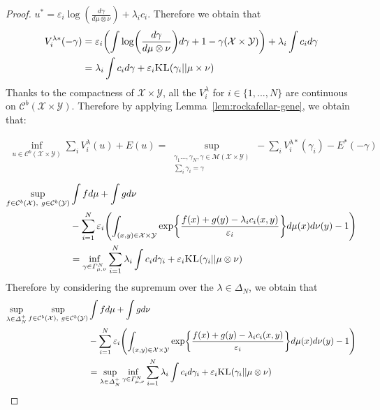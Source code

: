 \begin{proof}
$u^*=\varepsilon_i \log\left(\frac{d\gamma}{d\mu\otimes\nu}\right)+\lambda_i c_i$. Therefore we obtain that
\begin{align*}
 V^{\lambda*}_i(-\gamma)&=\varepsilon_i\left(\int \log\left(\frac{d\gamma}{d\mu\otimes\nu}\right)d\gamma +1- \gamma(\mathcal{X}\times\mathcal{Y})\right)+\lambda_i\int c_i d\gamma\\
 &=\lambda_i\int c_id\gamma+\varepsilon_i\KL(\gamma_i||\mu\times\nu)
\end{align*}   
Thanks to the compactness of $\mathcal{X}\times\mathcal{Y}$, all the $V_i^{\lambda}$ for $i\in\{1,...,N\}$ are continuous on $\mathcal{C}^b(\mathcal{X}\times\mathcal{Y})$. Therefore by applying Lemma~\ref{lem:rockafellar-gene}, we obtain that:

\begin{align*}
\inf_{u\in \mathcal{C}^b(\mathcal{X}\times\mathcal{Y})} \sum_i V_i^{\lambda}(u) + E(u) = \sup\limits_{\substack{\gamma_1...,\gamma_N,\gamma\in \mathcal{M}(\mathcal{X}\times\mathcal{Y})\\\sum_i \gamma_i = \gamma}}-\sum_i V_i^{\lambda*}(\gamma_i)-E^*(-\gamma)
\end{align*}
\begin{align*}
\sup\limits_{f\in \mathcal{C}^b(\mathcal{X}),~g\in\mathcal{C}^b(\mathcal{Y})}&\int fd\mu+\int gd\nu \\
& - \sum_{i=1}^N \varepsilon_i\left(\int_{(x,y)\in\mathcal{X}\times\mathcal{Y}} \exp{\frac{f(x)+g(y)-\lambda_ic_i(x,y)}{\varepsilon_i}}d\mu(x)d\nu(y)-1\right)\\
&= \inf_{\gamma\in\Gamma^N_{\mu,\nu}} \sum_{i=1}^N \lambda_i\int c_i d\gamma_i + \varepsilon_i\KL(\gamma_i||\mu\otimes\nu)
\end{align*}
Therefore by considering the supremum over the $\lambda\in\Delta_N$, we obtain that
\begin{align*}
 \sup_{\lambda\in\Delta^+_N}  \sup\limits_{f\in \mathcal{C}^b(\mathcal{X}),~g\in\mathcal{C}^b(\mathcal{Y})}&\int fd\mu+\int gd\nu \\
& - \sum_{i=1}^N \varepsilon_i\left(\int_{(x,y)\in\mathcal{X}\times\mathcal{Y}} \exp{\frac{f(x)+g(y)-\lambda_ic_i(x,y)}{\varepsilon_i}}d\mu(x)d\nu(y)-1\right)\\
   &=\sup_{\lambda\in\Delta^+_N}\inf_{\gamma\in\Gamma^N_{\mu,\nu}} \sum_{i=1}^N \lambda_i\int c_i d\gamma_i + \varepsilon_i \KL(\gamma_i||\mu\otimes\nu)
\end{align*}



\end{proof}
